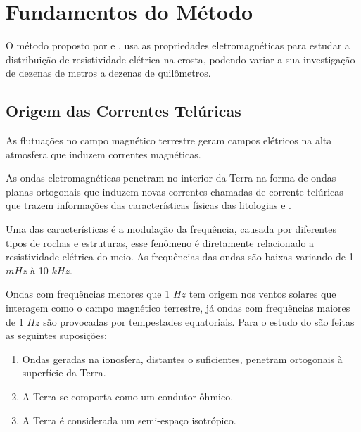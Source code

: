 \chapter{Fundamentos do Método \MT}
    \label{cap-fundamentosMT}    
    
    O método \MT proposto por \citeauthor{tikhonov50} \citeyearpar{tikhonov50} e
    \citeauthor{cagniard53} \citeyearpar{cagniard53}, usa as propriedades
    eletromagnéticas para estudar a distribuição de resistividade elétrica na crosta, 
    podendo variar a sua investigação de dezenas de metros a dezenas de 
    quilômetros.
    
    \section{Origem das Correntes Telúricas}
    
    As flutuações no campo magnético terrestre geram campos elétricos na alta atmosfera que induzem correntes magnéticas.
    
    As ondas eletromagnéticas penetram no interior da Terra na forma de ondas planas ortogonais que induzem novas correntes chamadas de corrente telúricas que trazem informações das características físicas das litologias \cite{tikhonov50} e \cite{cagniard53}.
    
    Uma das características é a modulação da frequência, causada por diferentes tipos de rochas e estruturas, esse fenômeno é diretamente 
	relacionado a resistividade elétrica do meio. As frequências das ondas são baixas variando de 1 $mHz$ à 10 $kHz$.
	
	Ondas com frequências menores que 1 $Hz$ tem origem nos ventos solares que interagem como o campo magnético terrestre, já ondas com frequências maiores de 1 $Hz$ são provocadas por tempestades equatoriais. Para o estudo do \MT são feitas as seguintes suposições:
    
    \begin{enumerate}
	    \item Ondas geradas na ionosfera, distantes o suficientes, penetram ortogonais à superfície da Terra.	    
	    \item A Terra se comporta como um condutor ôhmico.
	    \item A Terra é considerada um semi-espaço isotrópico.
	\end{enumerate}   
    
    

